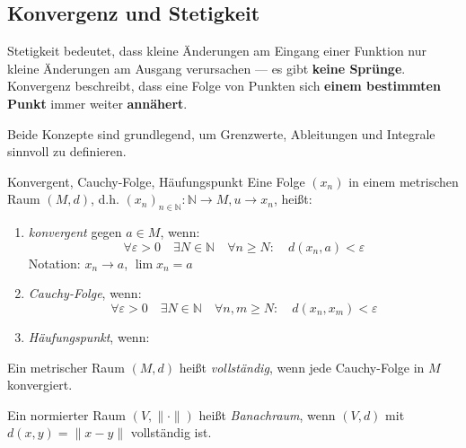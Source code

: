 \subsection{Konvergenz und Stetigkeit}

Stetigkeit bedeutet, dass kleine Änderungen am Eingang einer Funktion nur kleine Änderungen am Ausgang verursachen — es gibt \textbf{keine Sprünge}. \\

Konvergenz beschreibt, dass eine Folge von Punkten sich \textbf{einem bestimmten Punkt} immer weiter \textbf{annähert}.

Beide Konzepte sind grundlegend, um Grenzwerte, Ableitungen und Integrale sinnvoll zu definieren.

\begin{definition}{Konvergent, Cauchy-Folge, Häufungspunkt}
Eine Folge $(x_n)$ in einem metrischen Raum $(M, d)$, d.h. $(x_n)_{n \in \mathbb{N}} : \mathbb{N} \rightarrow M, u \rightarrow x_n$, heißt:
\begin{enumerate}
    \item \emph{konvergent} gegen $a \in M$, wenn:
    $$
        \forall \varepsilon > 0 \quad \exists N \in \mathbb{N} \quad \forall n \geq N: \quad d(x_n, a) < \varepsilon
    $$
    Notation: $x_n \to a$, $\lim x_n = a$
    
    \item \emph{Cauchy-Folge}, wenn:
    $$
        \forall \varepsilon > 0 \quad \exists N \in \mathbb{N} \quad \forall n, m \geq N: \quad d(x_n, x_m) < \varepsilon
    $$

    \item \emph{Häufungspunkt}, wenn:
\end{enumerate}
\end{definition}

\begin{definition}{}
Ein metrischer Raum $(M, d)$ heißt \emph{vollständig}, wenn jede Cauchy-Folge in $M$ konvergiert.

Ein normierter Raum $(V, \|\cdot\|)$ heißt \emph{Banachraum}, wenn $(V, d)$ mit $d(x, y) = \|x - y\|$ vollständig ist.
\end{definition}